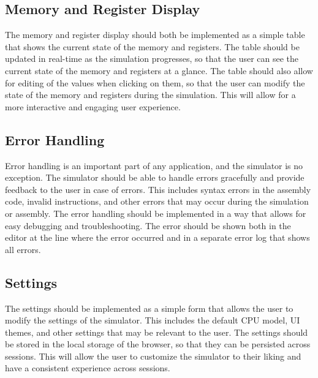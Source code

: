 \subsection{Memory and Register Display}
The memory and register display should both be implemented as a simple table that shows the current state of the memory and registers. The table should be updated in real-time as the simulation progresses, so that the user can see the current state of the memory and registers at a glance. The table should also allow for editing of the values when clicking on them, so that the user can modify the state of the memory and registers during the simulation. This will allow for a more interactive and engaging user experience.

\subsection{Error Handling}
Error handling is an important part of any application, and the simulator is no exception. The simulator should be able to handle errors gracefully and provide feedback to the user in case of errors. This includes syntax errors in the assembly code, invalid instructions, and other errors that may occur during the simulation or assembly. The error handling should be implemented in a way that allows for easy debugging and troubleshooting. The error should be shown both in the editor at the line where the error occurred and in a separate error log that shows all errors.

\subsection{Settings}
The settings should be implemented as a simple form that allows the user to modify the settings of the simulator. This includes the default CPU model, UI themes, and other settings that may be relevant to the user. The settings should be stored in the local storage of the browser, so that they can be persisted across sessions. This will allow the user to customize the simulator to their liking and have a consistent experience across sessions.








